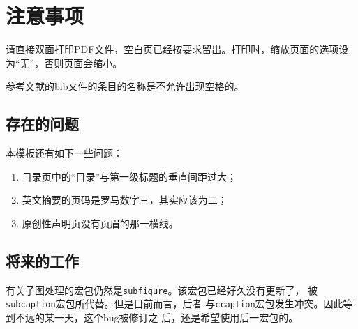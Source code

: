 
\chapter{注意事项}
\label{chap03}

请直接双面打印PDF文件，空白页已经按要求留出。打印时，缩放页面的选项设
为“无”，否则页面会缩小。

参考文献的bib文件的条目的名称是不允许出现空格的。

\section{存在的问题}

本模板还有如下一些问题：

\begin{enumerate}
\item 目录页中的“目录”与第一级标题的垂直间距过大；
\item 英文摘要的页码是罗马数字三，其实应该为二；
\item 原创性声明页没有页眉的那一横线。
\end{enumerate}

\section{将来的工作}

有关子图处理的宏包仍然是\texttt{subfigure}。该宏包已经好久没有更新了，
被\texttt{subcaption}宏包所代替。但是目前而言，后者
与\texttt{ccaption}宏包发生冲突。因此等到不远的某一天，这个bug被修订之
后，还是希望使用后一宏包的。






